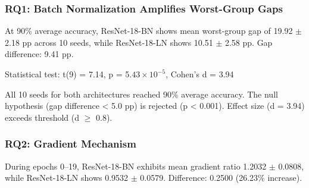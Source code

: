 
\subsubsection{RQ1: Batch Normalization Amplifies Worst-Group Gaps}

At 90\% average accuracy, ResNet-18-BN shows mean worst-group gap of 19.92 $\pm$ 2.18 pp across 10 seeds, while ResNet-18-LN shows 10.51 $\pm$ 2.58 pp. Gap difference: 9.41 pp.

\begin{table}[htbp]
\centering
{}
\end{table}

Statistical test: t(9) = 7.14, p = 5.$43\times 10^{-5}$, Cohen's d = 3.94

All 10 seeds for both architectures reached 90\% average accuracy. The null hypothesis (gap difference < 5.0 pp) is rejected (p < 0.001). Effect size (d = 3.94) exceeds threshold (d $\geq$ 0.8).

\subsubsection{RQ2: Gradient Mechanism}

During epochs 0--19, ResNet-18-BN exhibits mean gradient ratio 1.2032 $\pm$ 0.0808, while ResNet-18-LN shows 0.9532 $\pm$ 0.0579. Difference: 0.2500 (26.23\% increase).

\begin{table}[htbp]
\centering
{}
\end{table}

